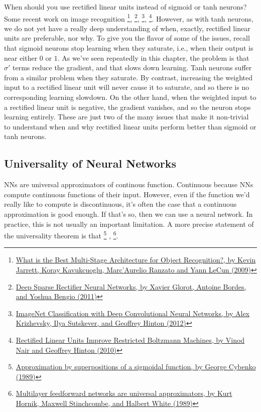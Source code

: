 When should you use rectified linear units instead of sigmoid or tanh neurons? Some recent work on image recognition \footnote{\href{http://neuralnetworksanddeeplearning.com/chap3.html\#other\_techniques}{What is the Best Multi-Stage Architecture for Object Recognition?, by Kevin Jarrett, Koray Kavukcuoglu, Marc'Aurelio Ranzato and Yann LeCun (2009)}}, \footnote{\href{http://proceedings.mlr.press/v15/glorot11a.html}{Deep Sparse Rectifier Neural Networks, by Xavier Glorot, Antoine Bordes, and Yoshua Bengio (2011)}}, \footnote{\href{https://papers.nips.cc/paper/4824-imagenet-classification-with-deep-convolutional-neural-networks.pdf}{ImageNet Classification with Deep Convolutional Neural Networks, by Alex Krizhevsky, Ilya Sutskever, and Geoffrey Hinton (2012)}}, \footnote{\href{https://www.cs.toronto.edu/~hinton/absps/reluICML.pdf}{Rectified Linear Units Improve Restricted Boltzmann Machines, by Vinod Nair and Geoffrey Hinton (2010)}}. However, as with tanh neurons, we do not yet have a really deep understanding of when, exactly, rectified linear units are preferable, nor why. To give you the flavor of some of the issues, recall that sigmoid neurons stop learning when they saturate, i.e., when their output is near either $0$ or $1$. As we've seen repeatedly in this chapter, the problem is that $\sigma'$ terms reduce the gradient, and that slows down learning. Tanh neurons suffer from a similar problem when they saturate. By contrast, increasing the weighted input to a rectified linear unit will never cause it to saturate, and so there is no corresponding learning slowdown. On the other hand, when the weighted input to a rectified linear unit is negative, the gradient vanishes, and so the neuron stops learning entirely. These are just two of the many issues that make it non-trivial to understand when and why rectified linear units perform better than sigmoid or tanh neurons.

\subsection{Universality of Neural Networks}
NNs are universal approximators of continous function. Continuous because NNs compute continuous functions of their input. However, even if the function we'd really like to compute is discontinuous, it's often the case that a continuous approximation is good enough. If that's so, then we can use a neural network. In practice, this is not usually an important limitation. A more precise statement of the universality theorem is that  \footnote{\href{http://www.dartmouth.edu/~gvc/Cybenko_MCSS.pdf}{Approximation by superpositions of a sigmoidal function, by George Cybenko (1989)}} , \footnote{\href{https://www.sciencedirect.com/science/article/abs/pii/0893608089900208}{Multilayer feedforward networks are universal approximators, by Kurt Hornik, Maxwell Stinchcombe, and Halbert White (1989)}}.

